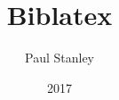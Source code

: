 \documentclass[nobib,hyphens]{tufte-book}
\title{Biblatex}
\author{Paul Stanley}
\date{2017}
\newcommand{\releasedate}{2017}
\begin{document}
\begin{CJK}{UTF8}{zhsong}

\makeatletter
\newcommand{\subtitle}[1]{
  \gdef\@subtitle{#1}}

\renewcommand{\maketitlepage}[0]{%
  \cleardoublepage%
  {%
   \sffamily%
   \begin{fullwidth}%
     \fontsize{18}{20}\selectfont\par\noindent\textcolor{darkgray}%
     {\allcaps{\thanklessauthor}}%
   \vspace{11.5pc}%
   \fontsize{24}{40}\selectfont
   \par\noindent\textcolor{darkgray}{\allcaps{\thanklesstitle}}%
    \ifdefined\@subtitle
     {\fontsize{14}{38}\selectfont
      \par\noindent\textcolor{darkgray}{\allcaps{\@subtitle}}}%
    \fi
      \vfill%
    \fontsize{14}{16}\selectfont\par\noindent\allcaps{\releasedate}%
    \end{fullwidth}%
    }
    \thispagestyle{empty}%
    \clearpage}
\makeatother

\subtitle{简易读本}%

\frontmatter


\mainmatter

























\backmatter








\end{CJK}
\end{document}
